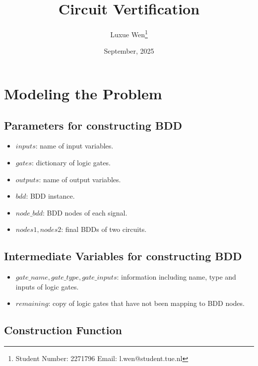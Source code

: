 \documentclass{article}
\title{Circuit  Vertification}
\author{Luxue Wen\thanks{Student Number: 2271796 Email: l.wen@student.tue.nl}}
\date{September, 2025}
\begin{document}
\maketitle

\section{Modeling the Problem}

\subsection{Parameters for constructing BDD}
\begin{itemize}
  \item $inputs$: name of input variables.
  \item $gates$: dictionary of logic gates.
  \item $outputs$: name of output variables.
  \item $bdd$: BDD instance.
  \item $node\_bdd$: BDD nodes of each signal.
  \item $nodes1, nodes2$: final BDDs of two circuits.
\end{itemize}

\subsection{Intermediate Variables for constructing BDD}
\begin{itemize}
  \item $gate\_name, gate\_type, gate\_inputs$: information including name, type and inputs of logic gates.
  \item $remaining$: copy of logic gates that have not been mapping to BDD nodes.
\end{itemize}

\subsection{Construction Function}
\end{document}

